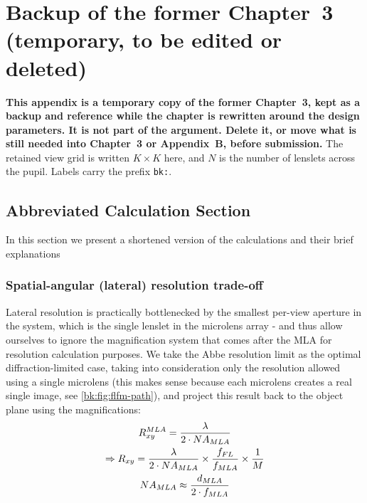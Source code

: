 \chapter{Backup of the former Chapter~3 (temporary, to be edited or deleted)}
\label{app:ch3-backup}


\textbf{This appendix is a temporary copy of the former Chapter~3, kept as a backup and reference while the chapter is rewritten around the design parameters. It is not part of the argument. Delete it, or move what is still needed into Chapter~3 or Appendix~B, before submission.} The retained view grid is written $K\times K$ here, and $N$ is the number of lenslets across the pupil. Labels carry the prefix \texttt{bk:}.

\section{Abbreviated Calculation Section}
\label{bk:sec:abbreviated-calculation-section}
In this section we present a shortened version of the calculations and their brief explanations

\subsection{Spatial-angular (lateral) resolution trade-off}
\label{bk:subsec:spatial-angular-resolution-trade-off}
Lateral resolution is practically bottlenecked by the smallest per-view aperture in the system, which is the single lenslet in the microlens array - and thus allow ourselves to ignore the magnification system that comes after the MLA for resolution calculation purposes. We take the Abbe resolution limit as the optimal diffraction-limited case, taking into consideration only the resolution allowed using a single microlens (this makes sense because each microlens creates a real single image, see \cref{bk:fig:flfm-path}), and project this result back to the object plane using the magnifications:
\begin{gather}
    R_{xy}^{MLA} = \frac{\lambda}{2\cdot NA_{MLA}} \\
    \Rightarrow R_{xy} = \frac{\lambda}{2\cdot NA_{MLA}}\times \frac{f_{FL}}{f_{MLA}}\times \frac{1}{M} \label{bk:eq:rxy} \\
    NA_{MLA} \approx \frac{d_{MLA}}{2\cdot f_{MLA}} \notag
\end{gather}

